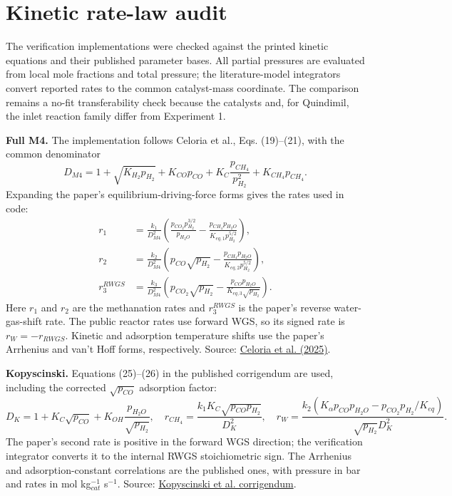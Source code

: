 \documentclass[10pt,a4paper]{article}
\begin{document}
\clearpage
\section{Kinetic rate-law audit}
The verification implementations were checked against the printed kinetic equations and their published parameter bases. All partial pressures are evaluated from local mole fractions and total pressure; the literature-model integrators convert reported rates to the common catalyst-mass coordinate. The comparison remains a no-fit transferability check because the catalysts and, for Quindimil, the inlet reaction family differ from Experiment 1.

\textbf{Full M4.} The implementation follows Celoria et al., Eqs. (19)--(21), with the common denominator
\[
D_{M4}=1+\sqrt{K_{H_2}p_{H_2}}+K_{CO}p_{CO}+K_C\frac{p_{CH_4}}{p_{H_2}^2}+K_{CH_4}p_{CH_4}.
\]
Expanding the paper's equilibrium-driving-force forms gives the rates used in code:
\[
\begin{aligned}
r_1&=\frac{k_1}{D_{M4}^2}\left(\frac{p_{CO_2}p_{H_2}^{3/2}}{p_{H_2O}}-\frac{p_{CH_4}p_{H_2O}}{K_{eq,1}p_{H_2}^{5/2}}\right),\\
r_2&=\frac{k_2}{D_{M4}^2}\left(p_{CO}\sqrt{p_{H_2}}-\frac{p_{CH_4}p_{H_2O}}{K_{eq,2}p_{H_2}^{5/2}}\right),\\
r_3^{RWGS}&=\frac{k_3}{D_{M4}^2}\left(p_{CO_2}\sqrt{p_{H_2}}-\frac{p_{CO}p_{H_2O}}{K_{eq,3}\sqrt{p_{H_2}}}\right).
\end{aligned}
\]
Here $r_1$ and $r_2$ are the methanation rates and $r_3^{RWGS}$ is the paper's reverse water-gas-shift rate. The public reactor rates use forward WGS, so its signed rate is $r_W=-r_{RWGS}$. Kinetic and adsorption temperature shifts use the paper's Arrhenius and van't Hoff forms, respectively. Source: \href{https://doi.org/10.1016/j.cej.2025.162113}{Celoria et al. (2025)}.

\textbf{Kopyscinski.} Equations (25)--(26) in the published corrigendum are used, including the corrected $\sqrt{p_{CO}}$ adsorption factor:
\[
D_K=1+K_C\sqrt{p_{CO}}+K_{OH}\frac{p_{H_2O}}{\sqrt{p_{H_2}}},\quad
r_{CH_4}=\frac{k_1K_C\sqrt{p_{CO}p_{H_2}}}{D_K^2},\quad
r_W=\frac{k_2\left(K_\alpha p_{CO}p_{H_2O}-p_{CO_2}p_{H_2}/K_{eq}\right)}{\sqrt{p_{H_2}}D_K^2}.
\]
The paper's second rate is positive in the forward WGS direction; the verification integrator converts it to the internal RWGS stoichiometric sign. The Arrhenius and adsorption-constant correlations are the published ones, with pressure in bar and rates in mol kg$_{cat}^{-1}$ s$^{-1}$. Source: \href{https://doi.org/10.1016/j.jcat.2010.05.001}{Kopyscinski et al. corrigendum}.
\end{document}
